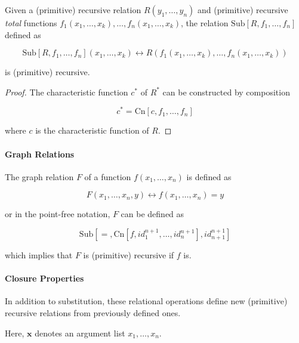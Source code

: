 Given a (primitive) recursive relation $R(y_1, \ldots, y_n)$ and (primitive) 
recursive \textit{total} functions $f_1(x_1, \ldots, x_k), \ldots, f_n(x_1, 
\ldots, x_k)$, the relation $\mathrm{Sub}[R, f_1, \ldots, f_n]$ defined as

$$
\mathrm{Sub}[R, f_1, \ldots, f_n](x_1, \ldots, x_k) 
\leftrightarrow
R(f_1(x_1, \ldots, x_k), \ldots, f_n(x_1, \ldots, x_k))
$$

is (primitive) recursive.

\begin{proof}
The characteristic function $c^*$ of $R^*$ can be constructed by composition

$$c^* = \mathrm{Cn}[c, f_1, \ldots, f_n]$$

where $c$ is the characteristic function of $R$.
\end{proof}

\paragraph{Graph Relations}

The graph relation $F$ of a function $f(x_1, \ldots, x_n)$ is defined as

$$
F(x_1, \ldots, x_n, y)
\leftrightarrow
f(x_1, \ldots, x_n) = y
$$

or in the point-free notation, $F$ can be defined as

$$
\mathrm{Sub}[=, \mathrm{Cn}[f, id^{n+1}_1, \ldots, id^{n+1}_n], id^{n+1}_{n+1}]
$$

which implies that $F$ is (primitive) recursive if $f$ is.

\paragraph{Closure Properties}

In addition to substitution, these relational operations define new (primitive)
recursive relations from previously defined ones.

Here, $\mathbf{x}$ denotes an argument list $x_1, \ldots, x_n$.

